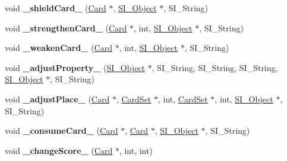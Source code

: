 \begin{DoxyCompactItemize}
\item 
\mbox{\label{class_field_a4c335ffdfde26fcf68939b45ce5b4bdd}} 
void {\bfseries \+\_\+shield\+Card\+\_\+} (\hyperlink{class_card}{Card} $\ast$, \hyperlink{class_s_i___object}{S\+I\+\_\+\+Object} $\ast$, S\+I\+\_\+\+String)
\item 
\mbox{\label{class_field_a5bf0e19326f81c126b2f47234b2c6a69}} 
void {\bfseries \+\_\+strengthen\+Card\+\_\+} (\hyperlink{class_card}{Card} $\ast$, int, \hyperlink{class_s_i___object}{S\+I\+\_\+\+Object} $\ast$, S\+I\+\_\+\+String)
\item 
\mbox{\label{class_field_a36950eed3461b27df18181ec04cb25c0}} 
void {\bfseries \+\_\+weaken\+Card\+\_\+} (\hyperlink{class_card}{Card} $\ast$, int, \hyperlink{class_s_i___object}{S\+I\+\_\+\+Object} $\ast$, S\+I\+\_\+\+String)
\item 
\mbox{\label{class_field_a87778738ca013be03b8aa5bc6a8ef513}} 
void {\bfseries \+\_\+adjust\+Property\+\_\+} (\hyperlink{class_s_i___object}{S\+I\+\_\+\+Object} $\ast$, S\+I\+\_\+\+String, S\+I\+\_\+\+String, S\+I\+\_\+\+String, \hyperlink{class_s_i___object}{S\+I\+\_\+\+Object} $\ast$, S\+I\+\_\+\+String)
\item 
\mbox{\label{class_field_a42bfc05297e92135641cf932ca3e8447}} 
void {\bfseries \+\_\+adjust\+Place\+\_\+} (\hyperlink{class_card}{Card} $\ast$, \hyperlink{class_card_set}{Card\+Set} $\ast$, int, \hyperlink{class_card_set}{Card\+Set} $\ast$, int, \hyperlink{class_s_i___object}{S\+I\+\_\+\+Object} $\ast$, S\+I\+\_\+\+String)
\item 
\mbox{\label{class_field_a34fc1cff2e3215ae551f757dd63c1b09}} 
void {\bfseries \+\_\+consume\+Card\+\_\+} (\hyperlink{class_card}{Card} $\ast$, \hyperlink{class_card}{Card} $\ast$, \hyperlink{class_s_i___object}{S\+I\+\_\+\+Object} $\ast$, S\+I\+\_\+\+String)
\item 
\mbox{\label{class_field_a54147d040fba163becc85ea25d483f41}} 
void {\bfseries \+\_\+change\+Score\+\_\+} (\hyperlink{class_card}{Card} $\ast$, int, int)
\item 
\mbox{\label{class_field_ac46538fb995e8dc07220ff2acbf83d95}} 

\end{DoxyCompactItemize}
